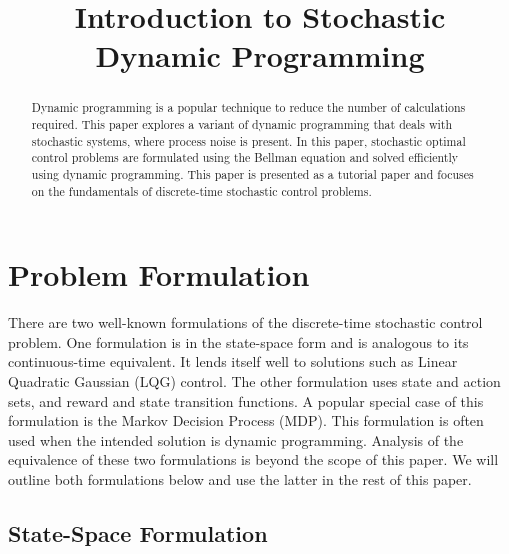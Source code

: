 \documentclass[conference]{IEEEtran}
\begin{document}
\title{Introduction to Stochastic Dynamic Programming}

\author{
}

\maketitle

\begin{abstract}
Dynamic programming is a popular technique to reduce the number of calculations required. This paper explores a variant of dynamic programming that deals with stochastic systems, where process noise is present. In this paper, stochastic optimal control problems are formulated using the Bellman equation and solved efficiently using dynamic programming. This paper is presented as a tutorial paper and focuses on the fundamentals of discrete-time stochastic control problems.
\end{abstract}

%

\section{Problem Formulation}

There are two well-known formulations of the discrete-time stochastic control problem. One formulation is in the state-space form and is analogous to its continuous-time equivalent. It lends itself well to solutions such as Linear Quadratic Gaussian (LQG) control. The other formulation uses state and action sets, and reward and state transition functions. A popular special case of this formulation is the Markov Decision Process (MDP). This formulation is often used when the intended solution is dynamic programming. Analysis of the equivalence of these two formulations is beyond the scope of this paper. We will outline both formulations below and use the latter in the rest of this paper.

\subsection{State-Space Formulation}
\end{document}
